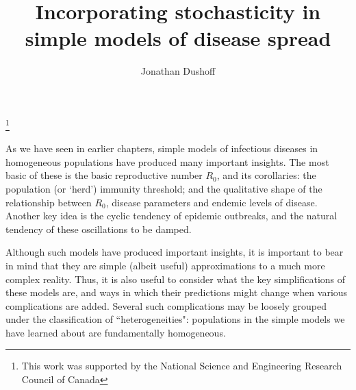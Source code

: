 \documentclass{amsproc}
\theoremstyle{definition}
\theoremstyle{remark}
\numberwithin{equation}{section}
\begin{document}
\title{Incorporating stochasticity in simple models of disease  spread}

\author{Jonathan Dushoff}
\address{Department of Biology, McMaster University, Hamilton, Ontario L8S-4K1}
\thanks{This work was supported by the National Science and Engineering Research Council of Canada}


\maketitle

\newcommand{\Nasell}{N\aa sell}
\newcommand{\et}{\emph{et~al.}}
\newcommand{\etc}{etc.\ }
\newcommand{\eg}{\emph{e.g.\ }}
\newcommand{\ie}{\emph{i.e.\ }}
\newcommand{\dfe}{disease-free equilibrium}
\newcommand{\cf}{\emph{cf.\ }}
\newcommand{\Rx}{\mbox{$\cal R$}}
\newcommand{\ct}[1]{\cite{#1}}
\newcommand{\Ro}{\ensuremath{R_0}}
\newcommand{\ro}{\mbox{$\rho$}}
\newcommand{\ds}{\displaystyle}
\newcommand{\fref}[1]{Figure \ref{#1.fig}}
\newcommand{\figlab}[1]{\label{#1.fig}}
\newcommand{\tref}[1]{Table \ref{#1.tab}}
\newcommand{\tlab}[1]{\label{#1.tab}}
\newcommand{\eref}[1]{(\ref{#1.eq})}
\newcommand{\eqlab}[1]{\label{#1.eq}}
\newcommand{\aster}{$\mbox{}^*$}
\newcommand{\up}[1]{$\mbox{}^#1$}
\newcommand{\blk}{\obeylines\setlength{\parskip}{0ex}\medskip}

\newlength{\figwidth}\setlength{\figwidth}{0.8\hsize}

\maketitle

As we have seen in earlier chapters, simple models of infectious diseases in homogeneous populations have produced many important insights.  The most basic of these is the basic reproductive number $R_0$, and its corollaries: the population (or `herd') immunity threshold; and the qualitative shape of the relationship between $R_0$, disease parameters and endemic levels of disease.  Another key idea is the cyclic tendency of epidemic outbreaks, and the natural tendency of these oscillations to be damped.

Although such models have produced important insights, it is important to bear in mind that they are simple (albeit useful) approximations to a much more complex reality.  Thus, it is also useful to consider what the key simplifications of these models are, and ways in which their predictions might change when various complications are added.  Several such complications may be loosely grouped under the classification of ``heterogeneities": populations in the simple models we have learned about are fundamentally homogeneous.
\end{document}
